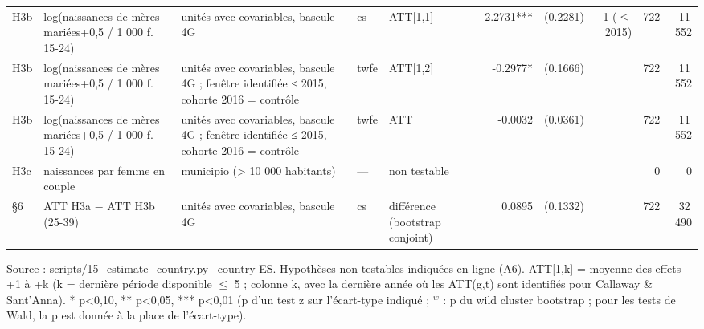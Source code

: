 \begin{table}
\begin{threeparttable}
\begin{tabular}{lp{4.4cm}p{6.3cm}lp{3.5cm}rrrrr}
H3b & log(naissances de mères mariées+0,5 / 1 000 f. 15-24) & unités avec covariables, bascule 4G & cs & ATT[1,1] & -2.2731*** & (0.2281) & 1 ($\leq$ 2015) & 722 & 11\,552 \\
H3b & log(naissances de mères mariées+0,5 / 1 000 f. 15-24) & unités avec covariables, bascule 4G ; fenêtre identifiée ≤ 2015, cohorte 2016 = contrôle & twfe & ATT[1,2] & -0.2977* & (0.1666) &  & 722 & 11\,552 \\
H3b & log(naissances de mères mariées+0,5 / 1 000 f. 15-24) & unités avec covariables, bascule 4G ; fenêtre identifiée ≤ 2015, cohorte 2016 = contrôle & twfe & ATT & -0.0032 & (0.0361) &  & 722 & 11\,552 \\
H3c & naissances par femme en couple & municipio (> 10 000 habitants) & — & non testable &  &  &  & 0 & 0 \\
§6 & ATT H3a $-$ ATT H3b (25-39) & unités avec covariables, bascule 4G & cs & différence (bootstrap conjoint) & 0.0895 & (0.1332) &  & 722 & 32\,490 \\
\bottomrule
\end{tabular}
\begin{tablenotes}\footnotesize
\item Source : scripts/15\_estimate\_country.py --country ES. Hypothèses non testables indiquées en ligne (A6). ATT[1,k] = moyenne des effets +1 à +k (k = dernière période disponible $\leq$ 5 ; colonne k, avec la dernière année où les ATT(g,t) sont identifiés pour Callaway \& Sant'Anna). * p<0,10, ** p<0,05, *** p<0,01 (p d'un test z sur l'écart-type indiqué ; $^{w}$ : p du wild cluster bootstrap ; pour les tests de Wald, la p est donnée à la place de l'écart-type).
\end{tablenotes}
\end{threeparttable}
\end{table}
